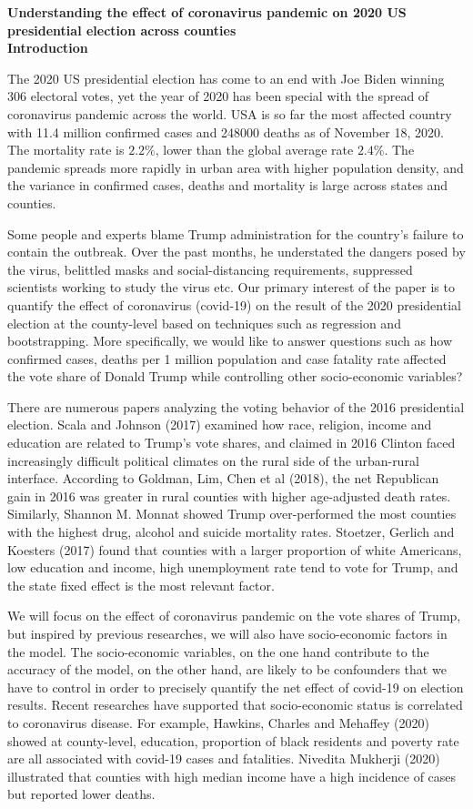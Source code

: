 \documentclass[12pt]{article}
\begin{document}
{\bf Understanding the effect of coronavirus pandemic on 2020 US presidential election across counties} \\

{\bf Introduction}

 The 2020 US presidential election has come to an end with Joe Biden winning 306 electoral votes, yet the year of 2020 has been special with the spread of coronavirus pandemic across the world. USA is so far the most affected country with 11.4 million confirmed cases and 248000 deaths as of November 18, 2020. The mortality rate is $2.2\%$, lower than the global average rate $2.4 \%$. The pandemic spreads more rapidly in urban area with higher population density, and the variance in confirmed cases, deaths and mortality is large across states and counties.
  
 Some people and experts blame Trump administration for the country's failure to contain the outbreak. Over the past months, he understated the dangers posed by the virus, belittled masks and social-distancing requirements, suppressed scientists working to study the virus etc. Our primary interest of the paper is to quantify the effect of coronavirus (covid-19) on the result of the 2020 presidential election at the county-level based on techniques such as regression and bootstrapping. More specifically, we would like to answer questions such as how confirmed cases, deaths per 1 million population and case fatality rate affected the vote share of Donald Trump while controlling other socio-economic variables?
 
 There are numerous papers analyzing the voting behavior of the 2016 presidential election. Scala and Johnson (2017) examined how race, religion, income and education are related to Trump's vote shares, and claimed in 2016 Clinton faced increasingly difficult political climates on the rural side of the urban-rural interface. According to  Goldman, Lim, Chen et al (2018), the net Republican gain in 2016 was greater in rural counties with higher age-adjusted death rates. Similarly, Shannon M. Monnat showed Trump over-performed the most counties with the highest drug, alcohol and suicide mortality rates. Stoetzer, Gerlich and Koesters (2017) found that counties with a larger proportion of white Americans, low education and income, high unemployment rate tend to vote for Trump, and the state fixed effect is the most relevant factor.
 
 
 We will focus on the effect of coronavirus pandemic on the vote shares of Trump, but inspired by previous researches, we will also have socio-economic factors in the model. The socio-economic variables, on the one hand contribute to the accuracy of the model, on the other hand, are likely to be confounders that we have to control in order to precisely quantify the net effect of covid-19 on election results. Recent researches have supported that socio-economic status is correlated to coronavirus disease. For example, Hawkins, Charles and Mehaffey (2020) showed at county-level, education, proportion of black residents and poverty rate are all associated with covid-19 cases and fatalities.  Nivedita Mukherji (2020) illustrated that counties with high median income have a high incidence of cases but reported lower deaths.
 
\end{document}
